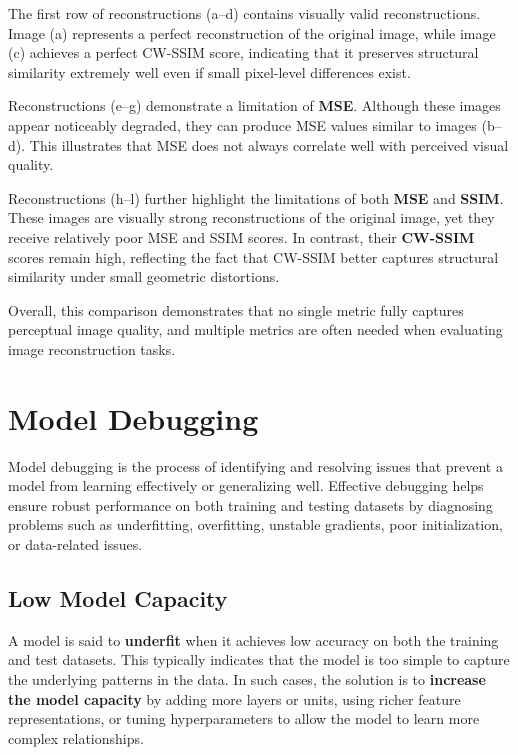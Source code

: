 \documentclass{article}
\begin{document}
The first row of reconstructions (a–d) contains visually valid reconstructions. Image (a) represents a perfect reconstruction of the original image, while image (c) achieves a perfect CW-SSIM score, indicating that it preserves structural similarity extremely well even if small pixel-level differences exist.

Reconstructions (e–g) demonstrate a limitation of \textbf{MSE}. Although these images appear noticeably degraded, they can produce MSE values similar to images (b–d). This illustrates that MSE does not always correlate well with perceived visual quality.

Reconstructions (h–l) further highlight the limitations of both \textbf{MSE} and \textbf{SSIM}. These images are visually strong reconstructions of the original image, yet they receive relatively poor MSE and SSIM scores. In contrast, their \textbf{CW-SSIM} scores remain high, reflecting the fact that CW-SSIM better captures structural similarity under small geometric distortions.

Overall, this comparison demonstrates that no single metric fully captures perceptual image quality, and multiple metrics are often needed when evaluating image reconstruction tasks.

\section{Model Debugging}

Model debugging is the process of identifying and resolving issues that prevent a model from learning effectively or generalizing well. Effective debugging helps ensure robust performance on both training and testing datasets by diagnosing problems such as underfitting, overfitting, unstable gradients, poor initialization, or data-related issues.

\subsection{Low Model Capacity}

A model is said to \textbf{underfit} when it achieves low accuracy on both the training and test datasets. This typically indicates that the model is too simple to capture the underlying patterns in the data. In such cases, the solution is to \textbf{increase the model capacity} by adding more layers or units, using richer feature representations, or tuning hyperparameters to allow the model to learn more complex relationships.
\end{document}
